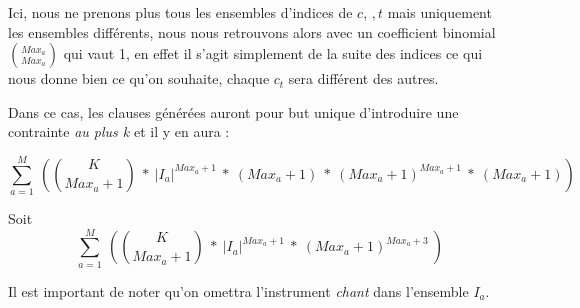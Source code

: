 \documentclass[11pt]{article}
\begin{document}
Ici, nous ne prenons plus tous les ensembles d'indices de $c$, $,t$ mais uniquement les ensembles différents, nous nous retrouvons alors avec un coefficient binomial ${Max_a \choose Max_a}$ qui vaut 1, en effet il s'agit simplement de la suite des indices ce qui nous donne bien ce qu'on souhaite, chaque $c_t$ sera différent des autres.

\label{addendum}

Dans ce cas, les clauses générées auront pour but unique d'introduire une contrainte \textsl{au plus k} et il y en aura :

$$\sum_{a=1}^{M}\ \left( {K \choose Max_a+1}\ * \ |I_a|^{Max_a+1}\ *\ \left(Max_a+1\right)\ *\ \left(Max_a+1\right)^{Max_a+1}\ *\  \left(Max_a+1\right) \right) $$

Soit\\

$$\sum_{a=1}^{M}\ \left( {K \choose Max_a+1}\ * \ |I_a|^{Max_a+1}\ *\ \left(Max_a+1\right)^{Max_a+3}\ \right) $$

Il est important de noter qu'on omettra l'instrument \textsl{chant} dans l'ensemble $I_a$.
\end{document}
